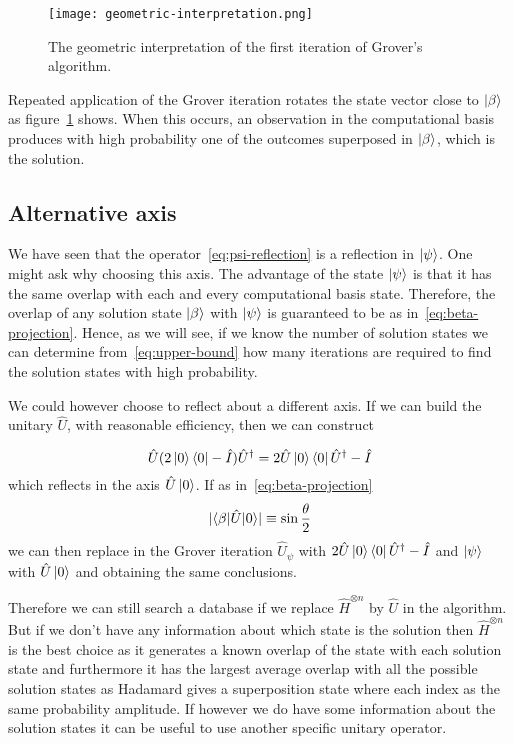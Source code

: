 \begin{figure}
\texttt{[image: geometric-interpretation.png]}
\centering
\caption{The geometric interpretation of the first iteration of Grover's algorithm.}
\label{fig:geometric-interpretation}
\end{figure}

Repeated application of the Grover iteration rotates the state vector close to $\ket{\beta}$ as figure~\ref{fig:geometric-interpretation} shows. When this occurs, an observation in the computational basis produces with high probability one of the outcomes superposed in $\ket{\beta}$, which is the solution.

\subsection{Alternative axis}
We have seen that the operator~\ref{eq:psi-reflection} is a reflection in $\ket{\psi}$. One might ask why choosing this axis. The advantage of the state $\ket{\psi}$ is that it has the same overlap with each and every computational basis state. Therefore, the overlap of any solution state $\ket{\beta}$ with $\ket{\psi}$ is guaranteed to be as in~\ref{eq:beta-projection}. Hence, as we will see, if we know the number of solution states we can determine from~\ref{eq:upper-bound} how many iterations are required to find the solution states with high probability.

We could however choose to reflect about a different axis. If we can build the unitary $\hat{U}$, with reasonable efficiency, then we can construct

\begin{equation*}
    \hat{U}(2\ket{0}\bra{0}-\hat{I})\hat{U}^\dag = 2\hat{U}\ket{0}\bra{0}\hat{U}^\dag -\hat{I}
\end{equation*}
which reflects in the axis $\hat{U}\ket{0}$.
If as in~\ref{eq:beta-projection}
\begin{equation*}
    \lvert\braket{\beta | \hat{U} |0}\rvert \equiv \sin\frac{\theta}{2}
\end{equation*}
we can then replace in the Grover iteration  $\hat{U}_\psi$ with $2\hat{U}\ket{0}\bra{0}\hat{U}^\dag -\hat{I}$ and $\ket{\psi}$ with $\hat{U}\ket{0}$ and obtaining the same conclusions.

Therefore we can still search a database if we replace $\hat{H}^{\otimes n}$ by $\hat{U}$ in the algorithm. But if we don't have any information about which state is the solution then $\hat{H}^{\otimes n}$ is the best choice as it generates a known overlap of the state with each solution state and furthermore it has the largest average overlap with all the possible solution states as Hadamard gives a superposition state where each index as the same probability amplitude. If however we do have some information about the solution states it can be useful to use another specific unitary operator.
